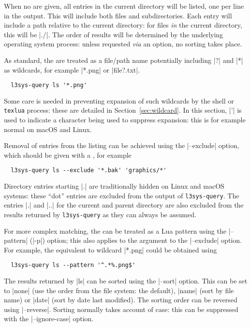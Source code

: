 \documentclass{l3doc}
\begin{document}
\begin{documentation}
When no  are given, all entries in the current directory will be
listed, one per line in the output. This will include both files and
subdirectories. Each entry will include a path relative to the current
directory: for files \emph{in} the current directory, this will be |./|. The
order of results will be determined by the underlying operating system process:
unless requested \emph{via} an option, no sorting takes place.

As standard, the  are treated as a file/path name potentially
including |?| and |*| as wildcards, for example |*.png| or |file?.txt|.
\begin{verbatim}
  l3sys-query ls '*.png'
\end{verbatim}
Some care is needed in preventing expansion of such wildcards by the shell or
\texttt{texlua} process: these are detailed in Section~\ref{sec:wildcard}. In
this section, |'| is used to indicate a character being used to suppress
expansion: this is for example normal on macOS and Linux.

Removal of entries from the listing can be achieved using the |--exclude|
option, which should be given with a , for example
\begin{verbatim}
  l3sys-query ls --exclude '*.bak' 'graphics/*'
\end{verbatim}
Directory entries starting |.| are traditionally hidden on Linux and macOS
systems: these \enquote{dot} entries are excluded from the output of
\texttt{l3sys-query}. The entries |.| and |..| for the current and parent
directory are also excluded from the results returned by \texttt{l3sys-query} as
they can always be assumed.

For more complex matching, the  can be treated as a Lua pattern using
the |--pattern| (|-p|) option; this also applies to the  argument to
the |--exclude| option. For example, the equivalent to wildcard |*.png| could be
obtained using
\begin{verbatim}
  l3sys-query ls --pattern '^.*%.png$'
\end{verbatim}

The results returned by |ls| can be sorted using the |--sort| option. This can
be set to |none| (use the order from the file system: the default), |name| (sort
by file name) or |date| (sort by date last modified). The sorting order can be
reversed using |--reverse|. Sorting normally takes account of case: this can be
suppressed with the |--ignore-case| option.


\end{documentation}
\end{document}

